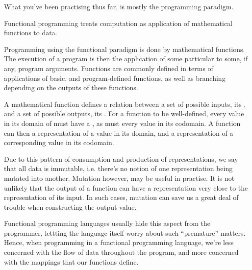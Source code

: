 
What you've been practising thus far, is mostly the 
programming paradigm.

\begin{definition}

Functional programming treats computation as application of mathematical
functions to  data.

\end{definition}

Programming using the functional paradigm is done by 
mathematical functions. The execution of a program is then the application of
some particular  to some, if any, program arguments.
Functions are commonly defined in terms of applications of basic, and
program-defined functions, as well as branching depending on the outputs of
these functions.

A mathematical function defines a relation between a set of possible inputs,
its , and a set of possible outputs, its . For a
function to be well-defined, every value in its domain of must have a
, as must every value in its codomain\footnotemark.
A function can then  a representation of a value in its domain,
and  a representation of a corresponding value in its codomain.


Due to this pattern of consumption and production of representations, we say
that all data is immutable, i.e. there's no notion of one representation being
mutated into another. Mutation however, may be useful in practise. It is not
unlikely that the output of a function can have a representation very close to
the representation of its input. In such cases, mutation can save us a great
deal of trouble when constructing the output value.

Functional programming languages usually hide this aspect from the programmer,
lettting the language itself worry about such ``premature'' matters. Hence,
when programming in a functional programming language, we're less concerned
with the flow of data throughout the program, and more concerned with the
mappings that our functions define.
